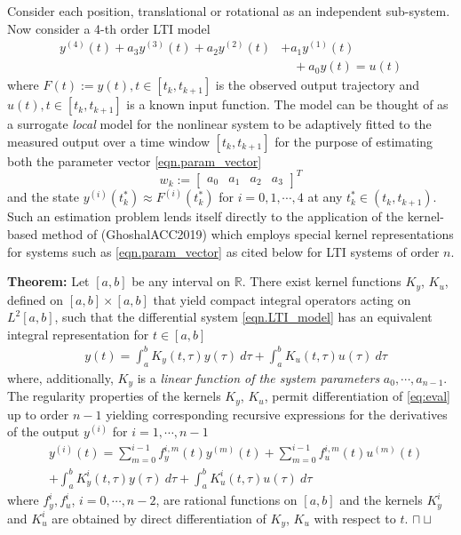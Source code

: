 \documentclass{article}
\newtheorem{theorem}{Theorem}
\newcommand{\eop}{\hfill $\sqcap\!\!\!\!\sqcup$} %
\begin{document}
Consider each position, translational or rotational as an independent sub-system. Now consider a 4-th order LTI model
\begin{equation}\label{eqn.LTI_model}	
\begin{split}
	y^{(4)}(t) + a_{3}y^{(3)}(t) + a_{2} y^{(2)}(t) &+ a_{1}y^{(1)}(t)\\
	&\quad + a_{0}y(t) = u(t)
\end{split}
\end{equation}
where  $F(t) := y(t), t \in [t_k,t_{k+1}]$ is the observed output trajectory and $u(t), t \in [t_k,t_{k+1}]$ is a known
input function.  The model can be thought of as a surrogate {\it local} model for the nonlinear system to be adaptively fitted to the measured output over a time window $[t_k,t_{k+1}]$ for the purpose of estimating both the parameter vector \eqref{eqn.param_vector}
\begin{equation}\label{eqn.param_vector}
w_k:=\begin{bmatrix}a_0& a_1& a_2&a_3\end{bmatrix}^T
\end{equation}
and the state $y^{(i)}(t^*_k) \approx F^{(i)}(t^*_k)$ for $i=0, 1, \cdots , 4$ at any
$t^*_k  \in (t_{k},t_{k+1})$. Such an estimation problem lends itself directly to the application of the kernel-based method of (GhoshalACC2019) which employs special kernel representations for systems such as \eqref{eqn.param_vector} as cited below for LTI systems of order $n$.

\textbf{Theorem:} Let $[a,b]$ be any interval on $\mathbb{R}$. There exist kernel functions $K_{y}$,  $K_{u}$,  defined on $[a,b] \times [a,b]$ that yield compact 
integral operators acting on $L^2[a,b]$, such that the differential system \eqref{eqn.LTI_model}	has an equivalent integral representation for $t \in [a,b]$
\begin{align}
& y(t) = \int_a^b K_{y}(t,\tau) y(\tau) \ d \tau + \int_a^b K_{u}(t,\tau) u(\tau) \ d \tau \label{eq:eval}
\end{align}
where, additionally, $K_{y}$ is a {\it linear function of the system parameters} $a_0, \cdots , a_{n-1}$.
The regularity properties of the kernels  $K_{y}$,  $K_{u}$, permit differentiation of \eqref{eq:eval} up to order $n-1$ yielding corresponding recursive expressions for the derivatives of the output $y^{(i)}$ for $ i=1, \cdots , n-1$ 
\begin{align}
& y^{(i)}(t) = \sum_{m=0}^{i-1} f_y^{i,m}(t) y^{(m)}(t) + \sum_{m=0}^{i-1} f_u^{i,m}(t) u^{(m)}(t) \nonumber \\
& + \int_a^b K_{y}^{i} (t,\tau) y(\tau) \ d \tau + \int_a^b K_{u}^{i} (t,\tau) u(\tau) \ d \tau  \label{eq:evalD}
\end{align}
where
$f_y^i, f_u^i$, $i=0, \cdots , n-2$, are rational functions on $[a,b]$ and the kernels $K_{y}^{i}$ and
$K_{u}^{i}$ are obtained by direct differentiation of $K_{y}$,  $K_{u}$ with respect to $t$. \hspace*{0pt}\hfill \eop
\end{document}

